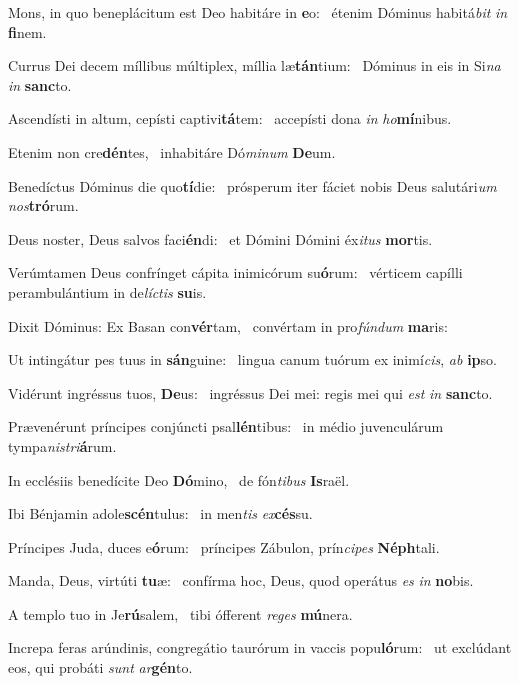 \item Mons, in quo beneplácitum est Deo habitáre in \textbf{e}o:~\psstar{} étenim Dóminus habitá\textit{bit} \textit{in} \textbf{fi}nem.
\item Currus Dei decem míllibus múltiplex, míllia læ\textbf{tán}tium:~\psstar{} Dóminus in eis in Si\textit{na} \textit{in} \textbf{sanc}to.
\item Ascendísti in altum, cepísti captivi\textbf{tá}tem:~\psstar{} accepísti dona \textit{in} \textit{ho}\textbf{mí}nibus.
\item Etenim non cre\textbf{dén}tes,~\psstar{} inhabitáre Dó\textit{minum} \textbf{De}um.
\item Benedíctus Dóminus die quo\textbf{tí}die:~\psstar{} prósperum iter fáciet nobis Deus salutári\textit{um} \textit{nos}\textbf{tró}rum.
\item Deus noster, Deus salvos faci\textbf{én}di:~\psstar{} et Dómini Dómini éx\textit{itus} \textbf{mor}tis.
\item Verúmtamen Deus confrínget cápita inimicórum su\textbf{ó}rum:~\psstar{} vérticem capílli perambulántium in de\textit{líctis} \textbf{su}is.
\item Dixit Dóminus: Ex Basan con\textbf{vér}tam,~\psstar{} convértam in pro\textit{fúndum} \textbf{ma}ris:
\item Ut intingátur pes tuus in \textbf{sán}guine:~\psstar{} lingua canum tuórum ex inimí\textit{cis}, \textit{ab} \textbf{ip}so.
\item Vidérunt ingréssus tuos, \textbf{De}us:~\psstar{} ingréssus Dei mei: regis mei qui \textit{est} \textit{in} \textbf{sanc}to.
\item Prævenérunt príncipes conjúncti psal\textbf{lén}tibus:~\psstar{} in médio juvenculárum tympa\textit{nistri}\textbf{á}rum.
\item In ecclésiis benedícite Deo \textbf{Dó}mino,~\psstar{} de fón\textit{tibus} \textbf{Is}raël.
\item Ibi Bénjamin adole\textbf{scén}tu\-lus:~\psstar{} in men\textit{tis} \textit{ex}\textbf{cés}su.
\item Príncipes Juda, duces e\textbf{ó}rum:~\psstar{} príncipes Zábulon, prín\textit{cipes} \textbf{Néph}tali.
\item Manda, Deus, virtúti \textbf{tu}æ:~\psstar{} confírma hoc, Deus, quod operátus \textit{es} \textit{in} \textbf{no}bis.
\item A templo tuo in Je\textbf{rú}salem,~\psstar{} tibi ófferent \textit{reges} \textbf{mú}nera.
\item Increpa feras arúndinis, congregátio taurórum in vaccis popu\textbf{ló}rum:~\psstar{} ut exclúdant eos, qui probáti \textit{sunt} \textit{ar}\textbf{gén}to.
